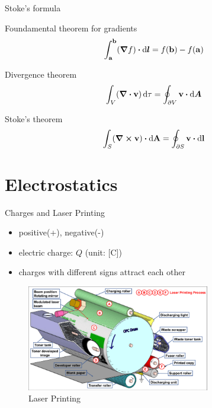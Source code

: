 \documentclass{beamer}
\begin{document}
\begin{frame}{Stoke's formula}
	\begin{beamerboxesrounded}{Foundamental theorem for gradients}
		\begin{equation}
			\int_{\vb{a}}^{\vb{b}} (\grad f) \vdot \dd{\vb*{l}} = f(\vb{b}) - f(\vb{a})
		\end{equation}
	\end{beamerboxesrounded}
	
	\begin{beamerboxesrounded}{Divergence theorem}
		\begin{equation}
			\int_V (\div \vb{v}) \dd{\tau} = \oint_{\partial V} \vb{v} \vdot \dd{\vb*{A}}
		\end{equation}
	\end{beamerboxesrounded}

	\begin{beamerboxesrounded}{Stoke's theorem}
		\begin{equation}
			\int_S (\curl \vb{v}) \vdot \dd{\vb{A}} = \oint_{\partial S} \vb{v} \vdot \dd{\vb{l}}
		\end{equation}
	\end{beamerboxesrounded}
\end{frame}





\section{Electrostatics}

\begin{frame}{Charges and Laser Printing}
	\begin{itemize}
		\item positive(+), negative(-)
		\item electric charge: $Q$ (unit: [C])
		\item charges with different signs attract each other
	\end{itemize}
	\vspace{.5em}
	\begin{figure}[htbp]
		\centering
		\includegraphics[width=8cm]{Images/Laser-printer}
		\caption{Laser Printing}
	\end{figure}
\end{frame}
\end{document}
